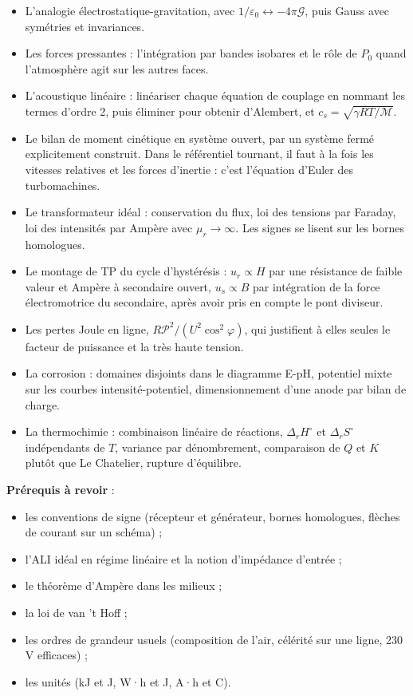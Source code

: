 \documentclass[11pt,a4paper]{article}
\providecommand{\tightlist}{\setlength{\itemsep}{0pt}\setlength{\parskip}{0pt}}
\begin{document}
\begin{itemize}
\tightlist
\item
  L'analogie électrostatique-\allowbreak{}gravitation, avec \(1/\varepsilon_0\leftrightarrow-4\pi\mathcal G\), puis Gauss avec symétries et invariances.
\item
  Les forces pressantes : l'intégration par bandes isobares et le rôle de \(P_0\) quand l'atmosphère agit sur les autres faces.
\item
  L'acoustique linéaire : linéariser chaque équation de couplage en nommant les termes d'ordre 2, puis éliminer pour obtenir d'Alembert, et \(c_s=\sqrt{\gamma RT/\mathcal M}\).
\item
  Le bilan de moment cinétique en système ouvert, par un système fermé explicitement construit. Dans le référentiel tournant, il faut à la fois les vitesses relatives et les forces d'inertie : c'est l'équation d'Euler des turbomachines.
\item
  Le transformateur idéal : conservation du flux, loi des tensions par Faraday, loi des intensités par Ampère avec \(\mu_r\to\infty\). Les signes se lisent sur les bornes homologues.
\item
  Le montage de TP du cycle d'hystérésis : \(u_r\propto H\) par une résistance de faible valeur et Ampère à secondaire ouvert, \(u_s\propto B\) par intégration de la force électromotrice du secondaire, après avoir pris en compte le pont diviseur.
\item
  Les pertes Joule en ligne, \(R\mathscr P^2/(U^2\cos^2\varphi)\), qui justifient à elles seules le facteur de puissance et la très haute tension.
\item
  La corrosion : domaines disjoints dans le diagramme E-pH, potentiel mixte sur les courbes intensité-potentiel, dimensionnement d'une anode par bilan de charge.
\item
  La thermochimie : combinaison linéaire de réactions, \(\Delta_rH^\circ\) et \(\Delta_rS^\circ\) indépendants de \(T\), variance par dénombrement, comparaison de \(Q\) et \(K\) plutôt que Le Chatelier, rupture d'équilibre.
\end{itemize}

\textbf{Prérequis à revoir} :

\begin{itemize}
\tightlist
\item
  les conventions de signe (récepteur et générateur, bornes homologues, flèches de courant sur un schéma) ;
\item
  l'ALI idéal en régime linéaire et la notion d'impédance d'entrée ;
\item
  le théorème d'Ampère dans les milieux ;
\item
  la loi de van 't Hoff ;
\item
  les ordres de grandeur usuels (composition de l'air, célérité sur une ligne, 230 V efficaces) ;
\item
  les unités (kJ et J, W·h et J, A·h et C).
\end{itemize}
\end{document}
